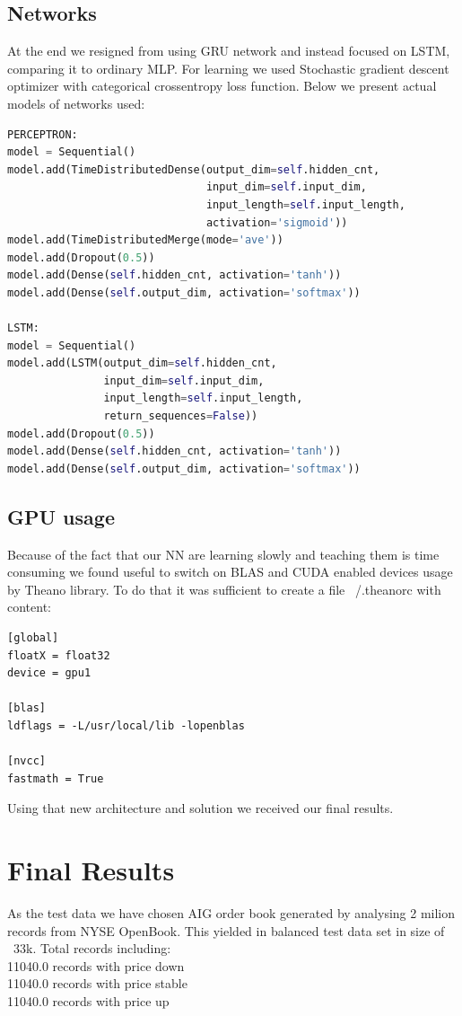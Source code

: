 \documentclass[twoside]{article}
\begin{document}
\begin{multicols}{2}
\subsection{Networks}
At the end we resigned from using GRU network and instead focused on LSTM, comparing it to ordinary MLP.
For learning we used Stochastic gradient descent optimizer with categorical crossentropy loss function.
Below we present actual models of networks used:
\begin{lstlisting}[language=Python, frame=single, basicstyle=\tiny]
PERCEPTRON:
model = Sequential()
model.add(TimeDistributedDense(output_dim=self.hidden_cnt,
                               input_dim=self.input_dim,
                               input_length=self.input_length,
                               activation='sigmoid'))
model.add(TimeDistributedMerge(mode='ave'))
model.add(Dropout(0.5))
model.add(Dense(self.hidden_cnt, activation='tanh'))
model.add(Dense(self.output_dim, activation='softmax'))

LSTM:
model = Sequential()
model.add(LSTM(output_dim=self.hidden_cnt,
			   input_dim=self.input_dim,
			   input_length=self.input_length,
			   return_sequences=False))
model.add(Dropout(0.5))
model.add(Dense(self.hidden_cnt, activation='tanh'))
model.add(Dense(self.output_dim, activation='softmax'))
\end{lstlisting}

\subsection{GPU usage}
Because of the fact that our NN are learning slowly and teaching them is time consuming we found
useful to switch on BLAS and CUDA enabled devices usage by Theano library. To do that it was sufficient to
create a file ~/.theanorc with content: \\
\begin{lstlisting}
[global]
floatX = float32
device = gpu1

[blas]
ldflags = -L/usr/local/lib -lopenblas

[nvcc]
fastmath = True
\end{lstlisting}

Using that new architecture and solution we received our final results.

\section{Final Results}

As the test data we have chosen AIG order book generated by analysing 2 milion records from NYSE OpenBook. This yielded in balanced test data set in size of ~33k.
 Total records including: \\
11040.0 records with price down \\
11040.0 records with price stable \\
11040.0 records with price up \\


\end{multicols}
\end{document}
